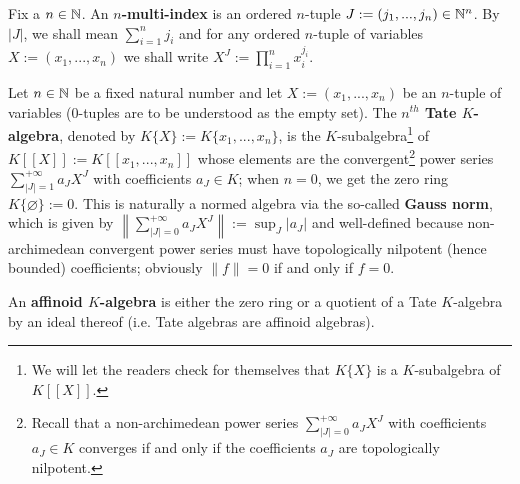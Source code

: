             \begin{convention} \label{conv: mutli_indices}
                Fix a $n \in \mathbb{N}$. An \textbf{$n$-multi-index} is an ordered $n$-tuple $J := (j_1, ..., j_n) \in \mathbb{N}^n$. By $|J|$, we shall mean $\sum_{i = 1}^n j_i$ and for any ordered $n$-tuple of variables $X := (x_1, ..., x_n)$ we shall write $X^J := \prod_{i = 1}^n x_i^{j_i}$.
            \end{convention}
            \begin{definition} \label{def: affinoid_algebras}
                Let $n \in \mathbb{N}$ be a fixed natural number and let $X := (x_1, ..., x_n)$ be an $n$-tuple of variables ($0$-tuples are to be understood as the empty set). The \textbf{$n^{th}$ Tate $K$-algebra}, denoted by $K\{X\} := K\{x_1, ..., x_n\}$, is the $K$-subalgebra\footnote{We will let the readers check for themselves that $K\{X\}$ is a $K$-subalgebra of $K[\![X]\!]$.} of $K[\![X]\!] := K[\![x_1, ..., x_n]\!]$ whose elements are the convergent\footnote{Recall that a non-archimedean power series $\sum_{|J| = 0}^{+\infty} a_J X^J$ with coefficients $a_J \in K$ converges if and only if the coefficients $a_J$ are topologically nilpotent.} power series $\sum_{|J| = 1}^{+\infty} a_J X^J$ with coefficients $a_J \in K$; when $n = 0$, we get the zero ring $K\{\varnothing\} := 0$. This is naturally a normed algebra via the so-called \textbf{Gauss norm}, which is given by $\left\|\sum_{|J| = 0}^{+\infty} a_J X^J\right\| := \sup_J |a_J|$ and well-defined because non-archimedean convergent power series must have topologically nilpotent (hence bounded) coefficients; obviously $\|f\| = 0$ if and only if $f = 0$.
                
                An \textbf{affinoid $K$-algebra} is either the zero ring or a quotient of a Tate $K$-algebra by an ideal thereof (i.e. Tate algebras are  affinoid algebras). 
            \end{definition}
            
